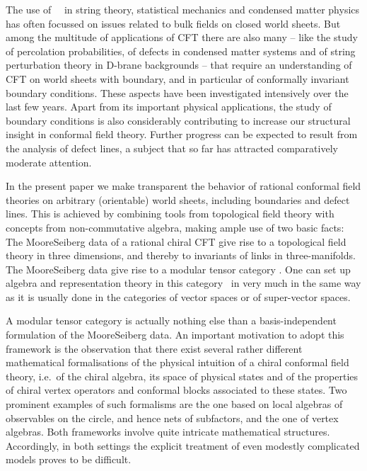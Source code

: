 

The use of \twodim\ \cft\ in
string theory, statistical mechanics and condensed matter physics has
often focussed on issues related to bulk fields on closed world sheets. 
But among the multitude of applications of CFT there are also many -- 
like the study of percolation probabilities, of defects in condensed matter 
systems and of string perturbation theory in D-brane backgrounds -- that 
require an understanding of CFT on world sheets with boundary, and in particular
of conformally invariant boundary conditions. These aspects have been
investigated intensively over the last few years. Apart from its important 
physical applications, the study of boundary conditions is also considerably 
contributing to increase our structural insight in conformal field theory.
Further progress can be expected to result from the analysis of defect 
lines, a subject that so far has attracted comparatively moderate attention.

\medskip

In the present paper we make transparent the behavior of rational 
conformal field theories on arbitrary (orientable) world sheets, 
including boundaries and defect lines. This is achieved by combining tools 
from topological field theory with concepts from non-commutative algebra,
making ample use of two basic facts:
\\[.23em]
\nxt The Moore\hy Seiberg data of a rational chiral CFT give rise to a
     topological field theory in three dimensions, and thereby to invariants
     of links in three-manifolds. 
\\[.23em]
\nxt The Moore\hy Seiberg data give rise to a modular tensor category \calc.
     One can set up algebra and representation theory in this category \calc\
     in very much in the same way as it is usually done in the categories of
     vector spaces or of super-vector spaces.

\medskip

A modular tensor category is actually nothing else than a 
basis-independent formulation of the Moore\hy Seiberg data.
An important motivation to adopt this framework is the observation that there
exist several rather different mathematical formalisations of the
physical intuition of a chiral conformal field theory, i.e.\ of the
chiral algebra, its space of physical states and of the properties of chiral
vertex operators and conformal blocks associated to these states. Two 
prominent examples of such formalisms are the one based on local algebras of
observables on the circle, and hence nets of subfactors, and the one of 
vertex algebras. 
%
Both frameworks involve quite intricate mathematical structures. Accordingly,
in both settings the explicit treatment of even modestly complicated models 
proves to be difficult. 

